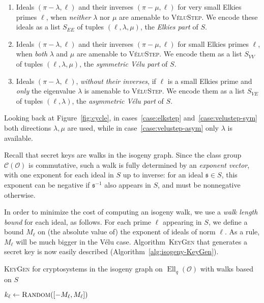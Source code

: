 \documentclass{llncs}
\newcommand{\Cl}{\mathcal{C}}
\renewcommand{\O}{\mathcal{O}}
\newcommand{\algstyle}[1]{\textsc{#1}}
\renewcommand{\frak}{\mathfrak}
\DeclareMathOperator{\Ell}{Ell}
\begin{document}
\begin{enumerate}
    \item \label{case:elkstep} 
        Ideals $(\pi - \lambda, \ell)$ and their inverses $(\pi - \mu, \ell)$
	    for very small Elkies primes $\ell$, 
        when \emph{neither} $\lambda$ nor $\mu$ are amenable to
        \algstyle{VéluStep}.
        We encode these ideals as
        a list $S_{EE}$ of tuples $(\ell, \lambda, \mu)$,
        the \emph{Elkies part} of $S$.
    \item \label{case:velustep-sym}
        Ideals $(\pi - \lambda, \ell)$ and their inverses $(\pi - \mu, \ell)$
	    for small Elkies primes $\ell$, 
        when \emph{both} $\lambda$ and $\mu$ are amenable to \algstyle{VéluStep}.
        We encode them as a list $S_{VV}$
        of tuples $(\ell, \lambda, \mu)$, 
        the \emph{symmetric Vélu part} of $S$.
    \item \label{case:velustep-asym}
        Ideals $(\pi - \lambda, \ell)$, \emph{without their inverses},
	    if $\ell$ is a small Elkies prime 
        and \emph{only} the eigenvalue $\lambda$ 
        is amenable to \algstyle{VéluStep}. 
        We encode them as a list $S_{VE}$ of tuples $(\ell, \lambda)$, 
        the \emph{asymmetric Vélu part} of $S$.
\end{enumerate}

Looking back at Figure~\ref{fig:cycle}, in cases~\ref{case:elkstep} and~\ref{case:velustep-sym}
both directions $\lambda,\mu$ are used, while in case~\ref{case:velustep-asym} only $\lambda$ is
available.

Recall that secret keys are walks in the isogeny graph.
Since the class group $\Cl(\O)$ is commutative, such a walk is fully
determined by an \emph{exponent vector}, with one exponent for each ideal in $S$
up to inverse: for an ideal $\frak s\in S$, this exponent can be negative if
$\frak s^{-1}$ also appears in $S$, and must be nonnegative otherwise.

In order to minimize the cost of computing an isogeny walk, we use a
\emph{walk length bound} for each ideal, as follows.
For each prime $\ell$ appearing in $S$, we define a bound $M_\ell$
on (the absolute value of) the exponent of ideals of norm $\ell$. As a rule,
$M_\ell$ will be much bigger in the Vélu case.
Algorithm~\algstyle{KeyGen} that generates a secret key is now
easily described (Algorithm~\ref{alg:isogeny-KeyGen}).

\begin{algorithm}
    \caption{\algstyle{KeyGen} for cryptosystems in the isogeny graph on
    $\Ell_q(\O)$ with walks based on $S$}
    \label{alg:isogeny-KeyGen}
     {
        $k_\ell\gets \algstyle{Random}([-M_\ell, M_\ell])$ 
        \;
    }
    \For{$(\ell, \lambda)\in S_{V, 1}$}{%
        $k_\ell\gets \algstyle{Random}([0,M_\ell])$ 
        \;
    }
\end{algorithm}
\end{document}
